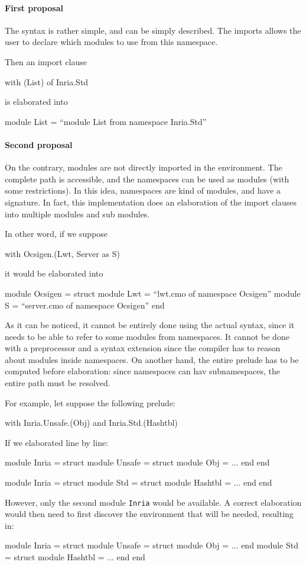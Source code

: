 \documentclass[11pt,a4paper]{article}
\begin{document}
\paragraph{First proposal}

The syntax is rather simple, and can be simply described. The imports allows the
user to declare which modules to use from this namespace. 

Then an import clause
\begin{OCaml}
with (List) of Inria.Std
\end{OCaml}
is elaborated into
\begin{OCaml}
module List = ``module List from namespace Inria.Std''
\end{OCaml}

\paragraph{Second proposal}

On the contrary, modules are not directly imported in the environment. The
complete path is accessible, and the namespaces can be used as modules (with
some restrictions). In this idea, namespaces are kind of modules, and have a
signature. In fact, this implementation does an elaboration of the import
clauses into multiple modules and sub modules.

In other word, if we suppose
\begin{OCaml}
with Ocsigen.(Lwt, Server as S)
\end{OCaml}
it would be elaborated into
\begin{OCaml}
module Ocsigen = struct
  module Lwt = ``lwt.cmo of namespace Ocsigen''
  module S = ``server.cmo of namespace Ocsigen''
end
\end{OCaml}

As it can be noticed, it cannot be entirely done using the actual syntax, since
it needs to be able to refer to some modules from namespaces. It cannot be done
with a preprocessor and a syntax extension since the compiler has to reason
about modules inside namespaces. On another hand, the entire prelude has to be
computed before elaboration: since namespaces can hav subnamespaces, the entire
path must be resolved.

For example, let suppose the following prelude:
\begin{OCaml}
with Inria.Unsafe.(Obj)
and Inria.Std.(Hashtbl)
\end{OCaml}
If we elaborated line by line:
\begin{OCaml}
module Inria = struct
  module Unsafe = struct
    module Obj = ...
  end
end

module Inria = struct
  module Std = struct
    module Hashtbl = ...
  end
end

\end{OCaml}
However, only the second module \texttt{Inria} would be available. A correct
elaboration would then need to first discover the environment that will be
needed, resulting in:
\begin{OCaml}
module Inria = struct
  module Unsafe = struct
    module Obj = ...
  end
  module Std = struct
    module Hashtbl = ...
  end
end
\end{OCaml}
\end{document}
